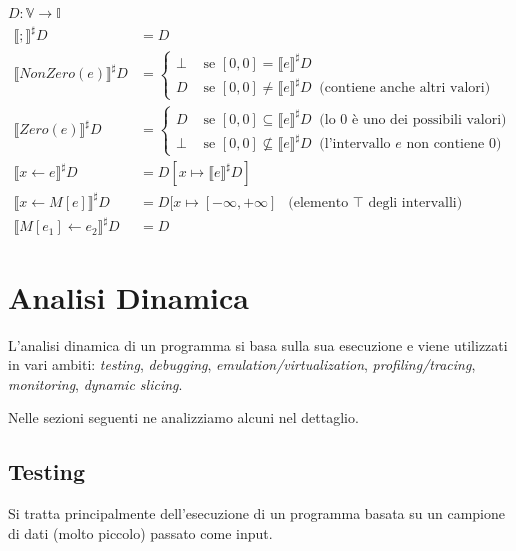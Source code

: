 \documentclass[a4paper, 10pt]{book}
\begin{document}
$D : \mathbb{V} \rightarrow \mathbb{I}$
\begin{align*}
	\llbracket ; \rrbracket^\sharp D &= D\\
	\llbracket NonZero(e) \rrbracket^\sharp D &=
	\begin{cases}
		\bot &\text{ se } [0, 0] = \llbracket e \rrbracket^\sharp D \\
		D &\text{ se } [0, 0] \neq \llbracket e \rrbracket^\sharp D~ \text{ (contiene anche altri valori)}
	\end{cases}\\
	\llbracket Zero(e) \rrbracket^\sharp D &=
	\begin{cases}
		D &\text{ se } [0, 0] \subseteq \llbracket e \rrbracket^\sharp D~ \text{ (lo $0$ è uno dei possibili valori)} \\
		\bot &\text{ se } [0, 0] \not \subseteq \llbracket e \rrbracket^\sharp D~ \text{ (l'intervallo $e$ non contiene $0$)}
	\end{cases}\\
	\llbracket x\leftarrow e \rrbracket^\sharp D &= D[x\mapsto \llbracket e\rrbracket^\sharp D]\\
	\llbracket x\leftarrow M[e] \rrbracket^\sharp D &= D[x\mapsto [-\infty, +\infty]~~ \text{ (elemento $\top$ degli intervalli)}\\
	\llbracket M[e_1]\leftarrow e_2 \rrbracket^\sharp D &= D
\end{align*}




\chapter{Analisi Dinamica}
L'analisi dinamica di un programma si basa sulla sua esecuzione e viene utilizzati in vari ambiti: \textit{testing}, \textit{debugging}, \textit{emulation/virtualization}, \textit{profiling/tracing}, \textit{monitoring}, \textit{dynamic slicing}.

Nelle sezioni seguenti ne analizziamo alcuni nel dettaglio.

\section{Testing}
Si tratta principalmente dell'esecuzione di un programma basata su un campione di dati (molto piccolo) passato come input.
\end{document}
